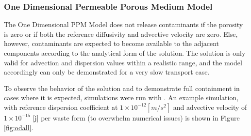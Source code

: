 

\subsubsection{One Dimensional Permeable Porous Medium Model}
The One Dimensional PPM Model does not release contaminants if the porosity is 
zero or if both the reference diffusivity and advective velocity are zero. 
Else, however, contaminants are expected to  become available to the adjacent 
components according to the analytical form of the solution. The solution is 
only valid for advection and dispersion values within a realistic range, and 
the model accordingly can only be demonstrated for a very slow transport case. 

To observe the behavior of the solution and to demonstrate full containment in 
cases where it is expected, simulations were run with . An example simulation, with 
reference dispersion coefficient at $1\times 10^{-12}[m/s^2]$ and advective 
velocity of $1\times 10^{-15}$ [j] 
per waste form (to overwhelm numerical issues) is shown in Figure \ref{fig:odall}.  


\FloatBarrier
